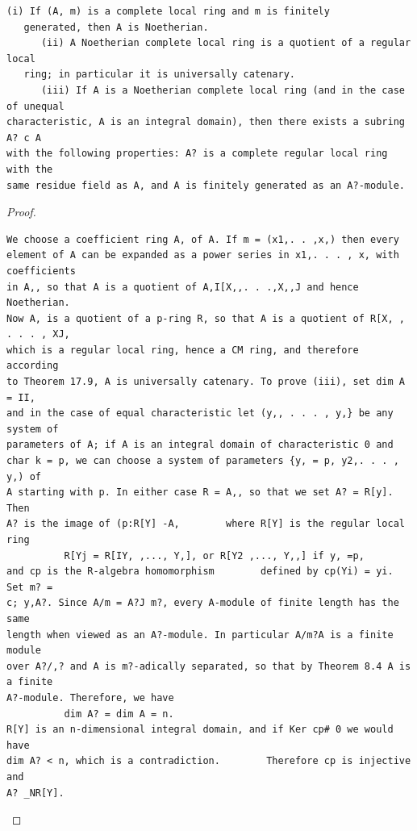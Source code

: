 \begin{theorem}\label{mcrt-auto-theorem-29-4}\uses{}
\begin{verbatim}
(i) If (A, m) is a complete local ring and m is finitely
   generated, then A is Noetherian.
      (ii) A Noetherian complete local ring is a quotient of a regular local
   ring; in particular it is universally catenary.
      (iii) If A is a Noetherian complete local ring (and in the case of unequal
characteristic, A is an integral domain), then there exists a subring A? c A
with the following properties: A? is a complete regular local ring with the
same residue field as A, and A is finitely generated as an A?-module.
\end{verbatim}
\end{theorem}
\begin{proof}
\begin{verbatim}
We choose a coefficient ring A, of A. If m = (x1,. . ,x,) then every
element of A can be expanded as a power series in x1,. . . , x, with coefficients
in A,, so that A is a quotient of A,I[X,,. . .,X,,J and hence Noetherian.
Now A, is a quotient of a p-ring R, so that A is a quotient of R[X, , . . . , XJ,
which is a regular local ring, hence a CM ring, and therefore according
to Theorem 17.9, A is universally catenary. To prove (iii), set dim A = II,
and in the case of equal characteristic let (y,, . . . , y,} be any system of
parameters of A; if A is an integral domain of characteristic 0 and
char k = p, we can choose a system of parameters {y, = p, y2,. . . , y,) of
A starting with p. In either case R = A,, so that we set A? = R[y]. Then
A? is the image of (p:R[Y] -A,        where R[Y] is the regular local ring
          R[Yj = R[IY, ,..., Y,], or R[Y2 ,..., Y,,] if y, =p,
and cp is the R-algebra homomorphism        defined by cp(Yi) = yi. Set m? =
c; y,A?. Since A/m = A?J m?, every A-module of finite length has the same
length when viewed as an A?-module. In particular A/m?A is a finite module
over A?/,? and A is m?-adically separated, so that by Theorem 8.4 A is a finite
A?-module. Therefore, we have
          dim A? = dim A = n.
R[Y] is an n-dimensional integral domain, and if Ker cp# 0 we would have
dim A? < n, which is a contradiction.        Therefore cp is injective and
A? _NR[Y].
\end{verbatim}
\end{proof}


